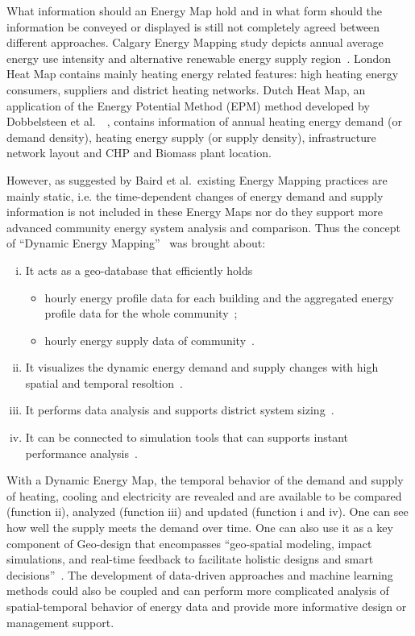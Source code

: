 What information should an Energy Map hold and in what form should the
information be conveyed or displayed is still not completely agreed
between different approaches. Calgary Energy Mapping study depicts
annual average energy use intensity and alternative renewable energy
supply region~\cite{aacip2009}. London Heat Map contains mainly
heating energy related features: high heating energy consumers,
suppliers and district heating networks. Dutch Heat Map, an
application of the Energy Potential Method (EPM) method developed by
Dobbelsteen et al.\ ~\cite{Dobbelsteen2013}, contains information of
annual heating energy demand (or demand density), heating energy
supply (or supply density), infrastructure network layout and CHP and
Biomass plant location.

However, as suggested by Baird et al.\ existing Energy Mapping
practices are mainly static, i.e. the time-dependent changes of energy
demand and supply information is not included in these Energy Maps nor
do they support more advanced community energy system analysis and
comparison. Thus the concept of ``Dynamic Energy
Mapping''~\cite{baird2014} was brought about:
\begin{enumerate}[i.]
\item It acts as a geo-database that efficiently holds
  \begin{itemize}
  \item hourly energy profile data for each building and the
    aggregated energy profile data for the whole
    community~\cite{baird2014};
  \item hourly energy supply data of community~\cite{baird2014}.
  \end{itemize}
\item It visualizes the dynamic energy demand and supply changes with
  high spatial and temporal resoltion~\cite{baird2014}.
\item It performs data analysis and supports district system
  sizing~\cite{baird2014}.
\item It can be connected to simulation tools that can supports
  instant performance analysis~\cite{baird2014}.
\end{enumerate}
 
With a Dynamic Energy Map, the temporal behavior of the demand and
supply of heating, cooling and electricity are revealed and are
available to be compared (function ii), analyzed (function iii) and
updated (function i and iv). One can see how well the supply meets the
demand over time. One can also use it as a key component of Geo-design
that encompasses ``geo-spatial modeling, impact simulations, and
real-time feedback to facilitate holistic designs and smart
decisions''~\cite{esriGeodesign2012}. The development of data-driven
approaches and machine learning methods could also be coupled and can
perform more complicated analysis of spatial-temporal behavior of
energy data and provide more informative design or management support.

